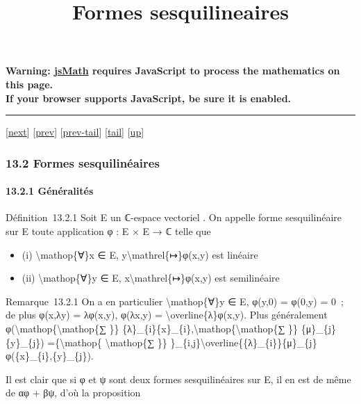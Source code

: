 \documentclass[]{article}
\title{Formes sesquilineaires}
\author{}
\date{}
\begin{document}
\maketitle

\textbf{Warning: \href{http://www.math.union.edu/locate/jsMath}{jsMath}
requires JavaScript to process the mathematics on this page.\\ If your
browser supports JavaScript, be sure it is enabled.}

\begin{center}\rule{3in}{0.4pt}\end{center}

{[}\href{coursse75.html}{next}{]} {[}\href{coursse73.html}{prev}{]}
{[}\href{coursse73.html\#tailcoursse73.html}{prev-tail}{]}
{[}\hyperref[tailcoursse74.html]{tail}{]}
{[}\href{coursch14.html\#coursse74.html}{up}{]}

\subsubsection{13.2 Formes sesquilinéaires}

\paragraph{13.2.1 Généralités}

Définition~13.2.1 Soit E un ℂ-espace vectoriel . On appelle forme
sesquilinéaire sur E toute application φ : E × E → ℂ telle que

\begin{itemize}
\itemsep1pt\parskip0pt
\item
  (i) \textbackslash{}mathop\{∀\}x ∈ E,
  y\textbackslash{}mathrel\{↦\}φ(x,y) est linéaire
\item
  (ii) \textbackslash{}mathop\{∀\}y ∈ E,
  x\textbackslash{}mathrel\{↦\}φ(x,y) est semilinéaire
\end{itemize}

Remarque~13.2.1 On a en particulier \textbackslash{}mathop\{∀\}y ∈ E,
φ(y,0) = φ(0,y) = 0~; de plus φ(x,λy) = λφ(x,y), φ(λx,y) =
\textbackslash{}overline\{λ\}φ(x,y). Plus généralement
φ(\textbackslash{}mathop\{\textbackslash{}mathop\{∑ \}\}
\{λ\}\_\{i\}\{x\}\_\{i\},\textbackslash{}mathop\{\textbackslash{}mathop\{∑
\}\} \{μ\}\_\{j\}\{y\}\_\{j\}) =\{\textbackslash{}mathop\{
\textbackslash{}mathop\{∑ \}\}
\}\_\{i,j\}\textbackslash{}overline\{\{λ\}\_\{i\}\}\{μ\}\_\{j\}φ(\{x\}\_\{i\},\{y\}\_\{j\}).

Il est clair que si φ et ψ sont deux formes sesquilinéaires sur E, il en
est de même de αφ + βψ, d'où la proposition
\end{document}

